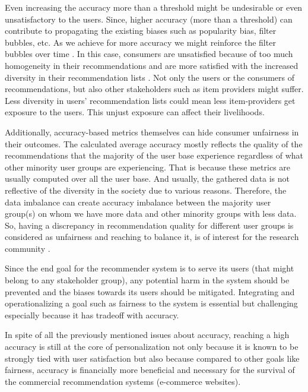 Even increasing the accuracy more than a threshold might be undesirable or even unsatisfactory to the users. Since, higher accuracy (more than a threshold) can contribute to propagating the existing biases such as popularity bias, filter bubbles, etc. As we achieve for more accuracy we might reinforce the filter bubbles over time . In this case, consumers are unsatisfied because of too much homogeneity in their recommendations  and are more satisfied with the increased diversity in their recommendation lists . Not only the users or the consumers of recommendations, but also other stakeholders such as item providers might suffer. Less diversity in users' recommendation lists could mean less item-providers get exposure to the users. This unjust exposure can affect their livelihoods.

Additionally, accuracy-based metrics themselves can hide consumer unfairness in their outcomes. The calculated average accuracy mostly reflects the quality of the recommendations that the majority of the user base experience regardless of what other minority user groups are experiencing. 
That is because these metrics are usually computed over all the user base. And usually, the gathered data is not reflective of the diversity in the society due to various reasons. Therefore, the data imbalance can create accuracy imbalance between the majority user group(s) on whom we have more data and other minority groups with less data. So, having a discrepancy in recommendation quality for different user groups is considered as unfairness and reaching to balance it, is of interest for the research community .

Since the end goal for the recommender system is to serve its users (that might belong to any stakeholder group), any potential harm in the system should be prevented and the biases towards its users should be mitigated. Integrating and operationalizing a goal such as fairness to the system is essential but challenging especially because it has tradeoff with accuracy.


In spite of all the previously mentioned issues about accuracy, reaching a high accuracy is still at the core of personalization not only because it is known to be strongly tied with user satisfaction but also because compared to other goals like fairness, accuracy is financially more beneficial and necessary for the survival of the commercial recommendation systems (e-commerce websites).


